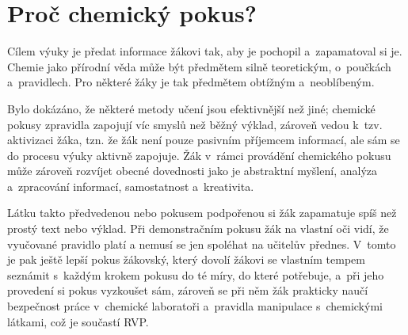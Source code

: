 \section{Proč chemický pokus?}
Cílem výuky je předat informace žákovi tak, aby je pochopil a~zapamatoval si je. Chemie jako přírodní věda může být předmětem silně teoretickým, o~poučkách a~pravidlech. Pro některé žáky je tak předmětem obtížným a~neoblíbeným. \cite{oblibenost}

Bylo dokázáno, že některé metody učení jsou efektivnější než jiné; \cite{badani} chemické pokusy zpravidla zapojují víc smyslů než běžný výklad, zároveň vedou k~tzv. aktivizaci žáka, tzn. že žák není pouze pasivním příjemcem informací, ale sám se do procesu výuky aktivně zapojuje. \cite{aktivizace} Žák v~rámci provádění chemického pokusu může zároveň rozvíjet obecné dovednosti jako je abstraktní myšlení, analýza a~zpracování informací, samostatnost a~kreativita. \cite{ostrava} \cite{aktivizace}

Látku takto předvedenou nebo pokusem podpořenou si žák zapamatuje spíš než prostý text nebo výklad. \cite{badani} Při demonstračním pokusu žák na vlastní oči vidí, že vyučované pravidlo platí a nemusí se jen spoléhat na učitelův přednes. V~tomto je pak ještě lepší pokus žákovský, který dovolí žákovi se vlastním tempem seznámit s~každým krokem pokusu do té míry, do které potřebuje, a~při jeho provedení si pokus vyzkoušet sám, zároveň se při něm žák prakticky naučí bezpečnost práce v~chemické laboratoři a~pravidla manipulace s~chemickými látkami, což je součastí RVP.


